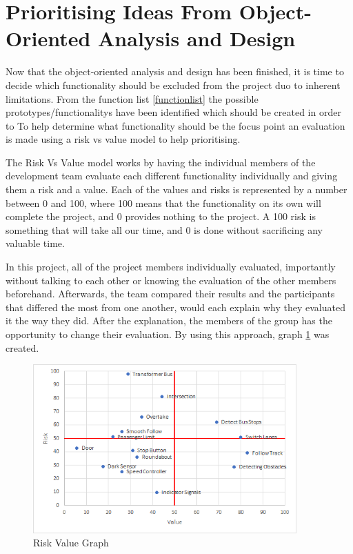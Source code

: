 \section{Prioritising Ideas From Object-Oriented Analysis and Design}

Now that the object-oriented analysis and design has been finished, it is time to decide which functionality should be excluded from the project duo to inherent limitations.
From the function list \ref{functionlist} the possible prototypes/functionalitys have been identified which should be created in order to 
To help determine what functionality should be the focus point an evaluation is made using a risk vs value model to help prioritising.

The Risk Vs Value model works by having the individual members of the development team evaluate each different functionality individually and giving them a risk and a value. Each of the values and risks is represented by a number between 0 and 100, where 100 means that the functionality on its own will complete the project, and 0 provides nothing to the project. A 100 risk is something that will take all our time, and 0 is done without sacrificing any valuable time. 

In this project, all of the project members individually evaluated, importantly without talking to each other or knowing the evaluation of the other members beforehand. Afterwards, the team compared their results and the participants that differed the most from one another, would each explain why they evaluated it the way they did. After the explanation, the members of the group has the opportunity to change their evaluation. By using this approach, graph \ref{fig:RiskValueGraph} was created.

\begin{figure}[!ht]
    \centering
	\includegraphics[width=0.9\textwidth]{Images/Graphs/RiskValue.png}
    \caption{Risk Value Graph}
    \label{fig:RiskValueGraph}
\end{figure}


